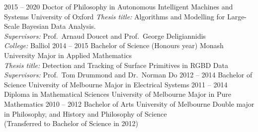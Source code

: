 \documentclass[9pt]{developercv} %
\begin{document}

\begin{entrylist}
  \entry
    {2015 -- 2020}
    {Doctor of Philosophy in Autonomous Intelligent Machines and Systems}
    {University of Oxford}
    {\textit{Thesis title:} Algorithms and Modelling for Large-Scale Bayesian Data Analysis. \\
    \textit{Supervisors:} Prof.\ Arnaud Doucet and Prof.\ George Deligiannidis\\
    \textit{College:} Balliol}
  \entry
    {2014 -- 2015}
    {Bachelor of Science (Honours year)}
    {Monash University}
    {Major in Applied Mathematics \\
    \textit{Thesis title:} Detection and Tracking of Surface Primitives in RGBD Data\\
    \textit{Supervisors:} Prof.\ Tom Drummond and Dr.\ Norman Do}
  \entry
    {2012 -- 2014}
    {Bachelor of Science}
    {University of Melbourne}
    {Major in Electrical Systems}
  \entry
    {2011 -- 2014}
    {Diploma in Mathematical Sciences}
    {University of Melbourne}
    {Major in Pure Mathematics}
  \entry
    {2010 -- 2012}
    {Bachelor of Arts}
    {University of Melbourne}
    {Double major in Philosophy, and History and Philosophy of Science\\(Transferred to Bachelor of Science in 2012)}
\end{entrylist}

\end{document}

